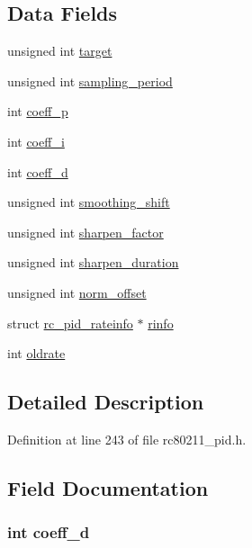 \subsection*{Data Fields}
\begin{DoxyCompactItemize}
\item 
unsigned int \hyperlink{structrc__pid__info_af10772e6d304a2ff59891323f52eb170}{target}
\item 
unsigned int \hyperlink{structrc__pid__info_ae8f25bd55b4a9f4801e99450be7d7423}{sampling\-\_\-period}
\item 
int \hyperlink{structrc__pid__info_a249e72e36aa45ff6e09bce908d9491f0}{coeff\-\_\-p}
\item 
int \hyperlink{structrc__pid__info_aa7a1ae58ae054f4634ba919f4567af37}{coeff\-\_\-i}
\item 
int \hyperlink{structrc__pid__info_afd03d1d56025c1bffa068b2d41be3452}{coeff\-\_\-d}
\item 
unsigned int \hyperlink{structrc__pid__info_a149ce33760f493b8318a62b2a7515598}{smoothing\-\_\-shift}
\item 
unsigned int \hyperlink{structrc__pid__info_a2b9d94e794aa853e15da008fe0644b64}{sharpen\-\_\-factor}
\item 
unsigned int \hyperlink{structrc__pid__info_afabb1c822dc4b2c7064e942d6ce04690}{sharpen\-\_\-duration}
\item 
unsigned int \hyperlink{structrc__pid__info_a29160d78004070d0c75f2dba5f014ce9}{norm\-\_\-offset}
\item 
struct \hyperlink{structrc__pid__rateinfo}{rc\-\_\-pid\-\_\-rateinfo} $\ast$ \hyperlink{structrc__pid__info_a4f4b42edd508d8b67f84acfb4d10981d}{rinfo}
\item 
int \hyperlink{structrc__pid__info_a7f0d2f9f4aa2b5b79fee366631f3558e}{oldrate}
\end{DoxyCompactItemize}


\subsection{Detailed Description}


Definition at line 243 of file rc80211\-\_\-pid.\-h.



\subsection{Field Documentation}
\hypertarget{structrc__pid__info_afd03d1d56025c1bffa068b2d41be3452}{
\subsubsection[{coeff\-\_\-d}]{\setlength{\rightskip}{0pt plus 5cm}int coeff\-\_\-d}}\label{structrc__pid__info_afd03d1d56025c1bffa068b2d41be3452}


